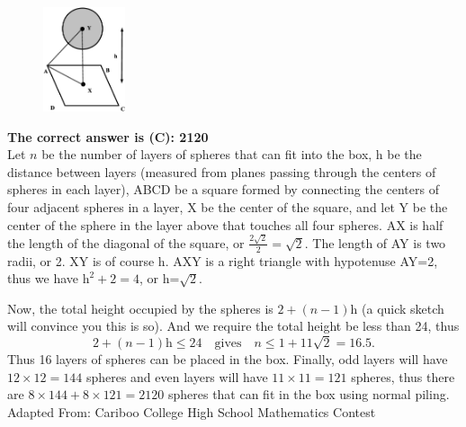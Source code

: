 \documentclass{article}
\begin{document}
\begin{figure}
	\includegraphics[width=24mm,viewport=14 42 526 688]{CCFR73-10pic3.eps}
\end{figure}

\textbf{The correct answer is (C): 2120}\\[1 ex]
Let $n$ be the number of layers of spheres that can fit into the box, h be the distance between layers (measured from planes passing through the centers of spheres in each layer), ABCD be a square formed by connecting the centers of four adjacent spheres in a layer, X be the center of the square, and let Y be the center of the sphere in the layer above that touches all four spheres. AX is half the length of the diagonal of the square, or $\frac{2\sqrt{2}}{2}=\sqrt{2}$. The length of AY is two radii, or 2. XY is of course h. AXY is a right triangle with hypotenuse AY=2, thus we have $\textrm{h}^{2}+2=4$, or h=$\sqrt{2}$.

Now, the total height occupied by the spheres is $2+(n-1)\textrm{h}$ (a quick sketch will convince you this is so). And we require the total height be less than 24, thus
\begin{equation*} 
2+(n-1)\textrm{h} \leq 24 \quad\textrm{gives}\quad n \leq1+11\sqrt{2}=16.5.
\end{equation*}
Thus 16 layers of spheres can be placed in the box. Finally, odd layers will have $12\times12=144$ spheres and even layers will have $11\times11=121$ spheres, thus there are $8\times144+8\times121=2120$ spheres that can fit in the box using normal piling.
\\[5 ex]

\scriptsize
Adapted From: Cariboo College High School Mathematics Contest
\end{document}
